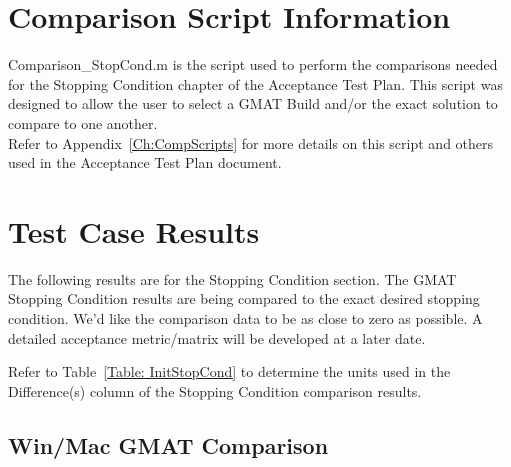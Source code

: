 \section{Comparison Script Information}
Comparison\_StopCond.m is the script used to perform the comparisons
needed for the Stopping Condition chapter of the Acceptance Test
Plan. This script was designed to allow the user to select a
GMAT Build and/or the exact solution to compare to one another.\\

Refer to Appendix~\ref{Ch:CompScripts} for more details on this
script and others used in the Acceptance Test Plan document.

\clearpage
\section{Test Case Results}
The following results are for the Stopping Condition section. The
GMAT Stopping Condition results are being compared to the exact
desired stopping condition. We'd like the comparison data to be as
close to zero as possible. A detailed acceptance metric/matrix will
be developed at a later date.

Refer to Table~\ref{Table: InitStopCond} to determine the units used
in the Difference(s) column of the Stopping Condition
comparison results.\\












\clearpage

\subsection{Win/Mac GMAT Comparison}











\clearpage

